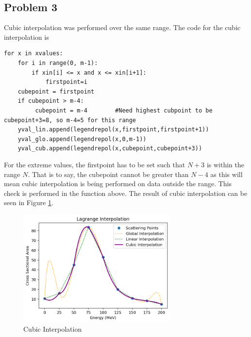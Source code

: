 \documentclass[aps,prb,groupedaddress,nofootinbib,floatfix]{revtex4}
\begin{document}
\subsection*{Problem 3}
Cubic interpolation was performed over the same range. The code for the cubic interpolation is
\begin{lstlisting}
for x in xvalues:
    for i in range(0, m-1):
        if xin[i] <= x and x <= xin[i+1]:
            firstpoint=i
    cubepoint = firstpoint
    if cubepoint > m-4:
         cubepoint = m-4        #Need highest cubpoint to be cubepoint+3=8, so m-4=5 for this range
    yval_lin.append(legendrepol(x,firstpoint,firstpoint+1))
    yval_glo.append(legendrepol(x,0,m-1))
    yval_cub.append(legendrepol(x,cubepoint,cubepoint+3))
\end{lstlisting}
For the extreme values, the firstpoint has to be set such that $N+3$ is within the range $N$. That is to say, the cubepoint cannot be greater than $N-4$ as this will mean cubic interpolation is being performed on data outside the range. This check is performed in the function above.
The result of cubic interpolation can be seen in Figure \ref{fig:Plot3}.
\begin{figure}[h]
	\includegraphics[width=8cm]{Plot3.png}
	\caption{Cubic Interpolation}
	\label{fig:Plot3}
\end{figure}
\end{document}
